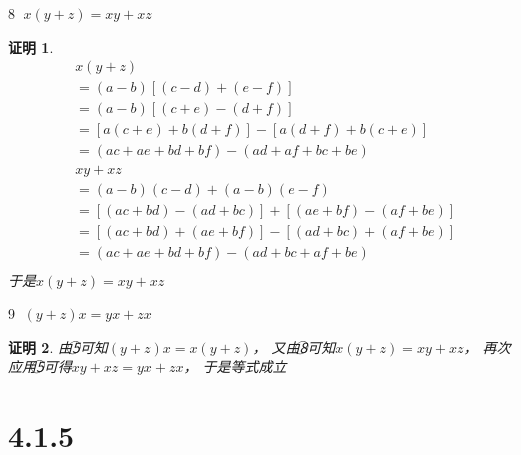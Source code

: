 \documentclass{article}
\theoremstyle{mystyle}
\theoremstyle{zproofstyle}
\newtheorem*{zproof}{证明}
\begin{document}
\textcircled{8} $x(y + z) = xy + xz$

\begin{zproof}
  \begin{align*}
     & x(y + z)                                  \\
     & = (a-b)[(c-d)+(e-f)]                      \\
     & = (a-b)[(c+e)-(d+f)]                      \\
     & = [a(c+e)+b(d+f)] - [a(d+f)+b(c+e)]       \\
     & = (ac+ae+bd+bf) - (ad+af+bc+be)           \\
     & xy + xz                                   \\
     & = (a-b)(c-d) + (a-b)(e-f)                 \\
     & = [(ac + bd)-(ad+bc)] + [(ae+bf)-(af+be)] \\
     & = [(ac + bd)+(ae+bf)] - [(ad+bc)+(af+be)] \\
     & = (ac+ae+bd+bf) - (ad+bc+af+be)           \\
  \end{align*}
  于是$x(y + z) = xy + xz$
\end{zproof}

\textcircled{9} $(y+z)x = yx+zx$

\begin{zproof}
  由\textcircled{5}可知$(y+z)x=x(y+z)$，
  又由\textcircled{8}可知$x(y+z)=xy+xz$，
  再次应用\textcircled{5}可得$xy+xz=yx+zx$，
  于是等式成立
\end{zproof}

\section*{4.1.5}
\end{document}
